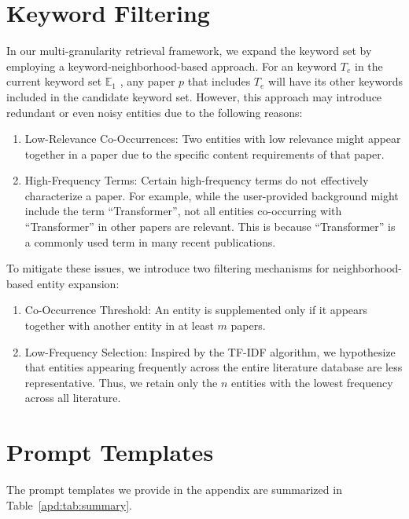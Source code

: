 \documentclass{article}
\theoremstyle{plain}
\theoremstyle{definition}
\theoremstyle{remark}
\begin{document}
\section{Keyword Filtering} \label{sec:kf}
In our multi-granularity retrieval framework, we expand the keyword set by employing a keyword-neighborhood-based approach. For an keyword $T_e$ in the current keyword set $\mathbb{E}_1$ , any paper $p$ that includes $T_e$ will have its other keywords included in the candidate keyword set.
However, this approach may introduce redundant or even noisy entities due to the following reasons:
\begin{enumerate}
\item Low-Relevance Co-Occurrences: Two entities with low relevance might appear together in a paper due to the specific content requirements of that paper.
\item High-Frequency Terms: Certain high-frequency terms do not effectively characterize a paper. For example, while the user-provided background might include the term ``Transformer'', not all entities co-occurring with ``Transformer'' in other papers are relevant. This is because ``Transformer'' is a commonly used term in many recent publications.
\end{enumerate}
To mitigate these issues, we introduce two filtering mechanisms for neighborhood-based entity expansion:
\begin{enumerate}
\item Co-Occurrence Threshold: An entity is supplemented only if it appears together with another entity in at least $m$ papers.
\item Low-Frequency Selection: Inspired by the TF-IDF algorithm, we hypothesize that entities appearing frequently across the entire literature database are less representative. Thus, we retain only the $n$ entities with the lowest frequency across all literature.
\end{enumerate}


\section{Prompt Templates} \label{sec:pt}

The prompt templates we provide in the appendix are summarized in Table~\ref{apd:tab:summary}.
\end{document}
